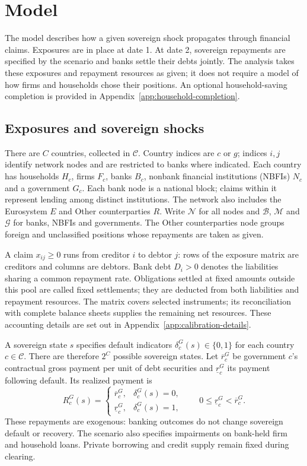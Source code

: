 \section{Model}\label{sec:model}

The model describes how a given sovereign shock propagates through financial claims. Exposures are in place at date 1. At date 2, sovereign repayments are specified by the scenario and banks settle their debts jointly. The analysis takes these exposures and repayment resources as given; it does not require a model of how firms and households chose their positions. An optional household-saving completion is provided in Appendix~\ref{app:household-completion}.

\subsection{Exposures and sovereign shocks}

There are $C$ countries, collected in $\mathcal C$. Country indices are $c$ or $g$; indices $i,j$ identify network nodes and are restricted to banks where indicated. Each country has households $H_c$, firms $F_c$, banks $B_c$, nonbank financial institutions (NBFIs) $N_c$ and a government $G_c$. Each bank node is a national block; claims within it represent lending among distinct institutions. The network also includes the Eurosystem $E$ and Other counterparties $R$. Write $\mathcal N$ for all nodes and $\mathcal B$, $\mathcal M$ and $\mathcal G$ for banks, NBFIs and governments. The Other counterparties node groups foreign and unclassified positions whose repayments are taken as given.

A claim $x_{ij}\geq0$ runs from creditor $i$ to debtor $j$: rows of the exposure matrix are creditors and columns are debtors. Bank debt $D_i>0$ denotes the liabilities sharing a common repayment rate. Obligations settled at fixed amounts outside this pool are called fixed settlements; they are deducted from both liabilities and repayment resources. The matrix covers selected instruments; its reconciliation with complete balance sheets supplies the remaining net resources. These accounting details are set out in Appendix~\ref{app:calibration-details}.

A sovereign state $s$ specifies default indicators $\delta_c^G(s)\in\{0,1\}$ for each country $c\in\mathcal C$. There are therefore $2^C$ possible sovereign states. Let $\overline r_c^G$ be government $c$'s contractual gross payment per unit of debt securities and $\underline r_c^G$ its payment following default. Its realized payment is
\[
 R_c^G(s)=\begin{cases}
 \overline r_c^G,&\delta_c^G(s)=0,\\
 \underline r_c^G,&\delta_c^G(s)=1,
 \end{cases}
 \qquad 0\leq\underline r_c^G<\overline r_c^G.
\]
These repayments are exogenous: banking outcomes do not change sovereign default or recovery. The scenario also specifies impairments on bank-held firm and household loans. Private borrowing and credit supply remain fixed during clearing.

